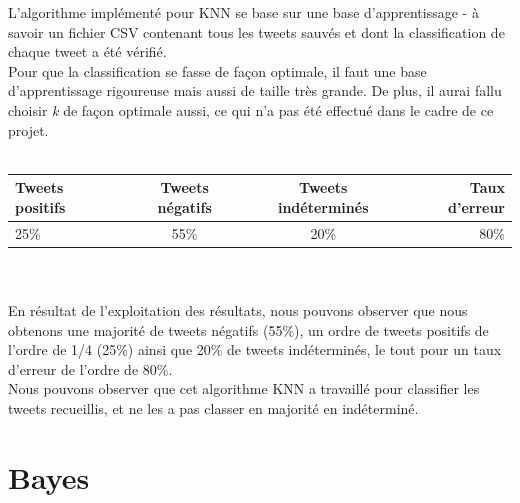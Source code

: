 \documentclass[pdftex,12pt,a4paper]{report}
\begin{document}
\begin{spacing}{1.2}
L'algorithme implémenté pour KNN se base sur une base d'apprentissage - à savoir un fichier CSV contenant tous les tweets sauvés et dont la classification de chaque tweet a été vérifié.
\\
Pour que la classification se fasse de façon optimale, il faut une base d'apprentissage rigoureuse mais aussi de taille très grande. De plus, il aurai fallu choisir \textit{k} de façon optimale aussi, ce qui n'a pas été effectué dans le cadre de ce projet.
\\
\\
\begin{tabular}{|l|c|c|r|}
  \hline
  \textbf{Tweets positifs} & \textbf{Tweets négatifs} & \textbf{Tweets indéterminés} & \textbf{Taux d'erreur}\\
  \hline
  25\% & 55\% & 20\% & 80\%\\
  \hline
\end{tabular}
\\
\\
En résultat de l'exploitation des résultats, nous pouvons observer que nous obtenons une majorité de tweets négatifs (55\%), un ordre de tweets positifs de l'ordre de 1/4 (25\%) ainsi que 20\% de tweets indéterminés, le tout pour un taux d'erreur de l'ordre de 80\%.
\\
Nous pouvons observer que cet algorithme KNN a travaillé pour classifier les tweets recueillis, et ne les a pas classer en majorité en indéterminé.

\section{Bayes}


\end{spacing}
\end{document}
